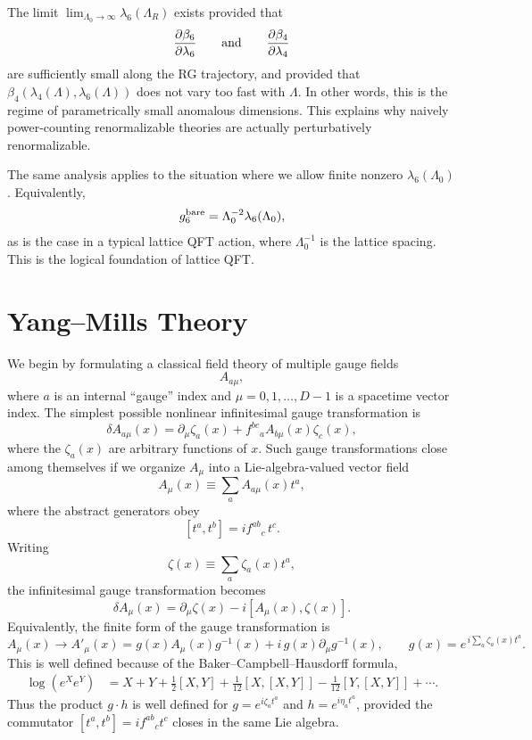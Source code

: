 The limit \(\lim_{\Lambda_0\to\infty}\lambda_6(\Lambda_R)\) exists provided
that
\[
  \frac{\partial\beta_6}{\partial\lambda_6}
  \qquad\hbox{and}\qquad
  \frac{\partial\beta_4}{\partial\lambda_4}
\]
are sufficiently small along the RG trajectory, and provided that
\(\beta_4(\lambda_4(\Lambda),\lambda_6(\Lambda))\) does not vary too fast
with \(\Lambda\).  In other words, this is the regime of parametrically
small anomalous dimensions.  This explains why naively power-counting
renormalizable theories are actually perturbatively renormalizable.

The same analysis applies to the situation where we allow finite nonzero
\(\lambda_6(\Lambda_0)\).  Equivalently,
\[
  g_6^{\rm bare}=\Lambda_0^{-2}\lambda_6(\Lambda_0),
\]
as is the case in a typical lattice QFT action, where
\(\Lambda_0^{-1}\) is the lattice spacing.  This is the logical foundation
of lattice QFT.

\section{Yang--Mills Theory}

We begin by formulating a classical field theory of multiple gauge fields
\[
  A_{a\mu},
\]
where \(a\) is an internal ``gauge'' index and
\(\mu=0,1,\ldots,D-1\) is a spacetime vector index.  The simplest possible
nonlinear infinitesimal gauge transformation is
\[
  \delta A_{a\mu}(x)
  =
  \partial_\mu\zeta_a(x)
  +f^{bc}{}_{a}A_{b\mu}(x)\zeta_c(x),
\]
where the \(\zeta_a(x)\) are arbitrary functions of \(x\).  Such gauge
transformations close among themselves if we organize \(A_\mu\) into a
Lie-algebra-valued vector field
\[
  A_\mu(x)\equiv \sum_a A_{a\mu}(x)t^a,
\]
where the abstract generators obey
\[
  [t^a,t^b]=i f^{ab}{}_{c}\,t^c .
\]
Writing
\[
  \zeta(x)\equiv\sum_a \zeta_a(x)t^a,
\]
the infinitesimal gauge transformation becomes
\[
  \delta A_\mu(x)=\partial_\mu\zeta(x)-i[A_\mu(x),\zeta(x)].
\]
Equivalently, the finite form of the gauge transformation is
\[
  A_\mu(x)\longrightarrow
  A'_\mu(x)
  =
  g(x)A_\mu(x)g^{-1}(x)
  +i\,g(x)\partial_\mu g^{-1}(x),
  \qquad
  g(x)=e^{\,i\sum_a\zeta_a(x)t^a}.
\]
This is well defined because of the Baker--Campbell--Hausdorff formula,
\[
\begin{aligned}
  \log(e^Xe^Y)
  &=
  X+Y+\frac12[X,Y]
  +\frac1{12}[X,[X,Y]]
  -\frac1{12}[Y,[X,Y]]
  +\cdots .
\end{aligned}
\]
Thus the product \(g\cdot h\) is well defined for
\(g=e^{i\zeta_a t^a}\) and \(h=e^{i\eta_a t^a}\), provided the commutator
\([t^a,t^b]=i f^{ab}{}_{c}t^c\) closes in the same Lie algebra.

